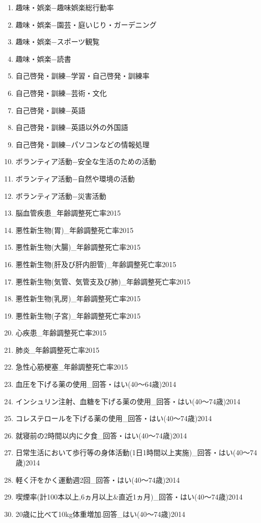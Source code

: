 \begin{multicols}{2}
\begin{enumerate}
  \item 趣味・娯楽−趣味娯楽総行動率
  \item 趣味・娯楽−園芸・庭いじり・ガーデニング
  \item 趣味・娯楽−スポーツ観覧
  \item 趣味・娯楽−読書
  \item 自己啓発・訓練−学習・自己啓発・訓練率
  \item 自己啓発・訓練−芸術・文化
  \item 自己啓発・訓練−英語
  \item 自己啓発・訓練−英語以外の外国語
  \item 自己啓発・訓練−パソコンなどの情報処理
  \item ボランティア活動−安全な生活のための活動
  \item ボランティア活動−自然や環境の活動
  \item ボランティア活動−災害活動
  \item 脳血管疾患\_年齢調整死亡率2015
  \item 悪性新生物(胃)\_年齢調整死亡率2015
  \item 悪性新生物(大腸)\_年齢調整死亡率2015
  \item 悪性新生物(肝及び肝内胆管)\_年齢調整死亡率2015
  \item 悪性新生物(気管、気管支及び肺)\_年齢調整死亡率2015
  \item 悪性新生物(乳房)\_年齢調整死亡率2015
  \item 悪性新生物(子宮)\_年齢調整死亡率2015
  \item 心疾患\_年齢調整死亡率2015
  \item 肺炎\_年齢調整死亡率2015
  \item 急性心筋梗塞\_年齢調整死亡率2015
  \item 血圧を下げる薬の使用\_回答・はい(40〜64歳)2014
  \item インシュリン注射、血糖を下げる薬の使用\_回答・はい(40〜74歳)2014
  \item コレステロールを下げる薬の使用\_回答・はい(40〜74歳)2014
  \item 就寝前の2時間以内に夕食\_回答・はい(40〜74歳)2014
  \item 日常生活において歩行等の身体活動(1日1時間以上実施)\_回答・はい(40〜74歳)2014
  \item 軽く汗をかく運動週2回\_回答・はい(40〜74歳)2014
  \item 喫煙率(計100本以上,6ヵ月以上\&直近1ヵ月)\_回答・はい(40〜74歳)2014
  \item 20歳に比べて10kg体重増加.回答\_はい(40〜74歳)2014

\end{enumerate}
\end{multicols}
